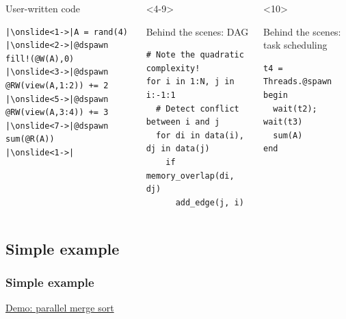 \documentclass{beamer}
\begin{document}
\begin{frame}[fragile]

\begin{columns}[T]
\begin{exampleblock}{User-written code}
\begin{verbatim}
|\onslide<1->|A = rand(4)
|\onslide<2->|@dspawn fill!(@W(A),0)
|\onslide<3->|@dspawn @RW(view(A,1:2)) += 2
|\onslide<5->|@dspawn @RW(view(A,3:4)) += 3
|\onslide<7->|@dspawn sum(@R(A))
|\onslide<1->|
\end{verbatim}    
\end{exampleblock}
  
\begin{onlyenv}<4-9>
  \begin{exampleblock}{Behind the scenes: DAG}
\begin{verbatim}
# Note the quadratic complexity!
for i in 1:N, j in i:-1:1
  # Detect conflict between i and j
  for di in data(i), dj in data(j)
    if memory_overlap(di, dj)
      add_edge(j, i)
\end{verbatim}
\end{exampleblock}
\end{onlyenv}
\begin{onlyenv}<10>
\begin{exampleblock}{Behind the scenes: task scheduling}
\begin{verbatim}
t4 = Threads.@spawn begin
  wait(t2); wait(t3)
  sum(A)
end
\end{verbatim}
\end{exampleblock}
\end{onlyenv}
\end{columns}


\end{frame}

\subsection{Simple example}

\begin{frame}
\frametitle{Simple example}
\center \href{run:./sort.slides.html}{\LARGE{Demo: parallel merge sort}}

\end{frame}
\end{document}
